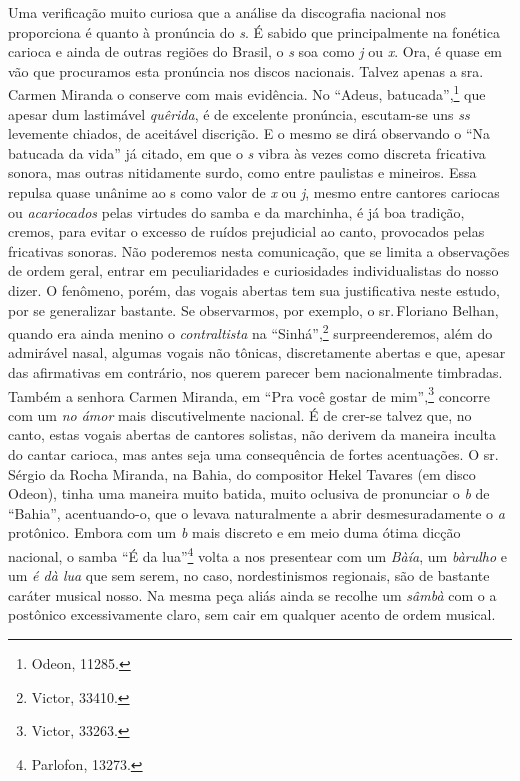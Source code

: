 Uma verificação muito curiosa que a análise da discografia nacional nos
proporciona é quanto à pronúncia do \textit{s}. É sabido que principalmente na
fonética carioca e ainda de outras regiões do Brasil, o \textit{s} soa como \textit{j} ou
\textit{x}. Ora, é quase em vão que procuramos esta pronúncia nos discos
nacionais. Talvez apenas a sra.\,Carmen Miranda o conserve com mais
evidência. No ``Adeus, batucada'',\footnote{Odeon, 11285.} que apesar dum lastimável
\textit{quêrida}, é de excelente pronúncia, escutam-se uns \textit{ss} levemente
chiados, de aceitável discrição. E o mesmo se dirá observando o ``Na
batucada da vida'' já citado, em que o \textit{s} vibra às vezes como discreta
fricativa sonora, mas outras nitidamente surdo, como entre paulistas e
mineiros. Essa repulsa quase unânime ao s como valor de \textit{x} ou \textit{j}, mesmo
entre cantores cariocas ou \textit{acariocados} pelas virtudes do samba e da
marchinha, é já boa tradição, cremos, para evitar o excesso de ruídos
prejudicial ao canto, provocados pelas fricativas sonoras. Não poderemos
nesta comunicação, que se limita a observações de ordem geral, entrar em
peculiaridades e curiosidades individualistas do nosso dizer. O
fenômeno, porém, das vogais abertas tem sua justificativa neste estudo,
por se generalizar bastante. Se observarmos, por exemplo, o sr.\,Floriano
Belhan, quando era ainda menino o \textit{contraltista} na ``Sinhá'',\footnote{Victor,
33410.} surpreenderemos, além do admirável nasal, algumas vogais não
tônicas, discretamente abertas e que, apesar das afirmativas em
contrário, nos querem parecer bem nacionalmente timbradas. Também a
senhora Carmen Miranda, em ``Pra você gostar de mim'',\footnote{Victor, 33263.}
concorre com um \textit{no ámor} mais discutivelmente nacional. É de crer-se
talvez que, no canto, estas vogais abertas de cantores solistas, não
derivem da maneira inculta do cantar carioca, mas antes seja uma
consequência de fortes acentuações. O sr.\,Sérgio da Rocha Miranda, na
Bahia, do compositor Hekel Tavares (em disco Odeon), tinha uma maneira
muito batida, muito oclusiva de pronunciar o \textit{b} de ``Bahia'',
acentuando-o, que o levava naturalmente a abrir desmesuradamente o \textit{a}
protônico. Embora com um \textit{b} mais discreto e em meio duma ótima dicção
nacional, o samba ``É da lua''\footnote{Parlofon, 13273.} volta a nos presentear
com um \textit{Bàía}, um \textit{bàrulho} e um \textit{é dà lua} que sem serem, no
caso, nordestinismos regionais, são de bastante caráter musical nosso.
Na mesma peça aliás ainda se recolhe um \textit{sâmbà} com o a postônico
excessivamente claro, sem cair em qualquer acento de ordem musical.

